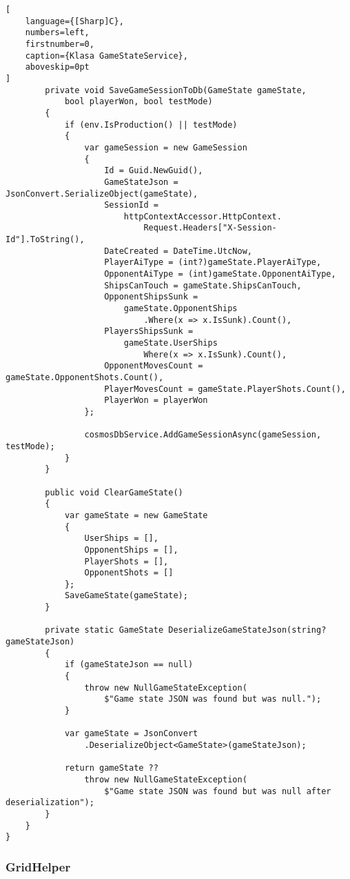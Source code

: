 \begin{addmargin}[0mm]{0mm}
\begin{lstlisting}[
    language={[Sharp]C},
    numbers=left,
    firstnumber=0,
    caption={Klasa GameStateService},
    aboveskip=0pt
]
        private void SaveGameSessionToDb(GameState gameState,
            bool playerWon, bool testMode)
        {
            if (env.IsProduction() || testMode)
            {
                var gameSession = new GameSession
                {
                    Id = Guid.NewGuid(),
                    GameStateJson = JsonConvert.SerializeObject(gameState),
                    SessionId =
                        httpContextAccessor.HttpContext.
                            Request.Headers["X-Session-Id"].ToString(),
                    DateCreated = DateTime.UtcNow,
                    PlayerAiType = (int?)gameState.PlayerAiType,
                    OpponentAiType = (int)gameState.OpponentAiType,
                    ShipsCanTouch = gameState.ShipsCanTouch,
                    OpponentShipsSunk =
                        gameState.OpponentShips
                            .Where(x => x.IsSunk).Count(),
                    PlayersShipsSunk =
                        gameState.UserShips
                            Where(x => x.IsSunk).Count(),
                    OpponentMovesCount = gameState.OpponentShots.Count(),
                    PlayerMovesCount = gameState.PlayerShots.Count(),
                    PlayerWon = playerWon
                };

                cosmosDbService.AddGameSessionAsync(gameSession, testMode);
            }
        }

        public void ClearGameState()
        {
            var gameState = new GameState
            {
                UserShips = [],
                OpponentShips = [],
                PlayerShots = [],
                OpponentShots = []
            };
            SaveGameState(gameState);
        }

        private static GameState DeserializeGameStateJson(string? gameStateJson)
        {
            if (gameStateJson == null)
            {
                throw new NullGameStateException(
                    $"Game state JSON was found but was null.");
            }

            var gameState = JsonConvert
                .DeserializeObject<GameState>(gameStateJson);

            return gameState ??
                throw new NullGameStateException(
                    $"Game state JSON was found but was null after deserialization");
        }
    }
}
\end{lstlisting}
\end{addmargin}


\subsubsection{GridHelper}

